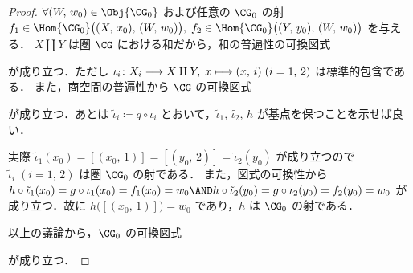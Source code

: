 \documentclass[algtopo_main]{subfiles}
\begin{document}
\begin{proof}
    $\forall (W,\, w_0) \in \Obj{\CG_0}$ および任意の $\CG_0$ の射 $f_1 \in \Hom{\CG_0}\bigl((X,\, x_0),\, (W,\, w_0) \bigr),\; f_2 \in \Hom{\CG_0}\bigl( (Y,\, y_0),\, (W,\, w_0) \bigr)$ を与える．
    $X \amalg Y$ は圏 $\CG$ における和だから，和の普遍性の可換図式
    \begin{center}
    \end{center}
    が成り立つ．ただし $\iota_i \colon X_i \longrightarrow X \amalg Y,\; x \longmapsto (x,\, i) \; (i=1,\, 2)$ は標準的包含である．
    また，\hyperref[col:univ-quotient]{商空間の普遍性}から $\CG$ の可換図式
    \begin{center}
    \end{center}
    が成り立つ．あとは $\tilde{\iota}_i \coloneqq q \circ \iota_i$ とおいて，$\tilde{\iota}_1,\, \tilde{\iota_2},\, h$ が基点を保つことを示せば良い．
    
    実際
    $\tilde{\iota}_1 (x_0) = [(x_0,\, 1)] = [(y_0,\, 2)] = \tilde{\iota}_2(y_0)$
    が成り立つので $\tilde{\iota}_i\; (i=1,\, 2)$ は圏 $\CG_0$ の射である．
    また，図式の可換性から $h \circ \tilde{\iota}_1(x_0) = g \circ \iota_1(x_0) = f_1(x_0) = w_0 \AND h \circ \tilde{\iota}_2(y_0) = g \circ \iota_2(y_0) = f_2(y_0) = w_0$ が成り立つ．故に $h\bigl([(x_0,\, 1)]\bigr) = w_0$ であり，$h$ は $\CG_0$ の射である．
    
    以上の議論から，$\CG_0$ の可換図式
    \begin{center}
    \end{center}
    が成り立つ．
\end{proof}
\end{document}
